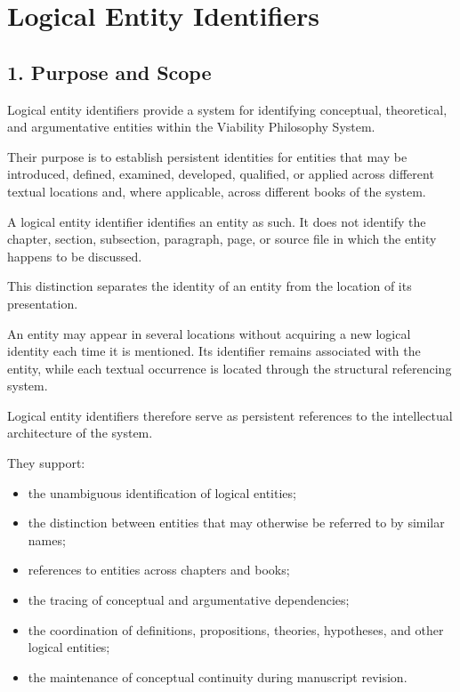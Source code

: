 
\cleardoublepage

\section*{Logical Entity Identifiers}

{}


\subsection*{1. Purpose and Scope}

Logical entity identifiers provide a system for
identifying conceptual, theoretical, and
argumentative entities within the Viability
Philosophy System.

Their purpose is to establish persistent identities
for entities that may be introduced, defined,
examined, developed, qualified, or applied across
different textual locations and, where applicable,
across different books of the system.

A logical entity identifier identifies an entity
as such. It does not identify the chapter, section,
subsection, paragraph, page, or source file in which
the entity happens to be discussed.

This distinction separates the identity of an
entity from the location of its presentation.

An entity may appear in several locations without
acquiring a new logical identity each time it is
mentioned. Its identifier remains associated with
the entity, while each textual occurrence is
located through the structural referencing system.

Logical entity identifiers therefore serve as
persistent references to the intellectual
architecture of the system.

They support:

\begin{itemize}
    \item the unambiguous identification of logical
    entities;
    \item the distinction between entities that
    may otherwise be referred to by similar names;
    \item references to entities across chapters
    and books;
    \item the tracing of conceptual and argumentative
    dependencies;
    \item the coordination of definitions, propositions,
    theories, hypotheses, and other logical entities;
    \item the maintenance of conceptual continuity
    during manuscript revision.
\end{itemize}


